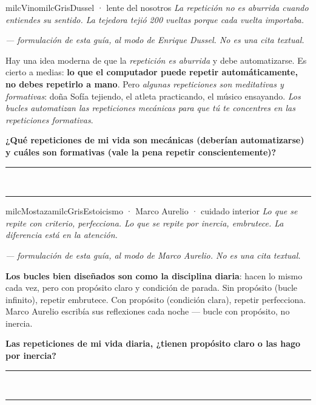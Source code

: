 \documentclass[11pt,letterpaper]{article}
\newcommand{\linead}[1]{\noindent\color{milcLinea}\rule{#1}{0.5pt}\color{milcNegro}}
\begin{document}
\begin{softbox}{milcVino}{milcGris}{Dussel · lente del nosotros}
\textit{La repetición no es aburrida cuando entiendes su sentido. La tejedora tejió 200 vueltas porque cada vuelta importaba.}

{\footnotesize\itshape\color{milcNegro!70}--- formulación de esta guía, al modo de Enrique Dussel. No es una cita textual.}

Hay una idea moderna de que la \emph{repetición es aburrida} y debe automatizarse. Es cierto a medias: \textbf{lo que el computador puede repetir automáticamente, no debes repetirlo a mano}. Pero \emph{algunas repeticiones son meditativas y formativas}: doña Sofía tejiendo, el atleta practicando, el músico ensayando. \emph{Los bucles automatizan las repeticiones mecánicas para que tú te concentres en las repeticiones formativas}.

\textbf{¿Qué repeticiones de mi vida son mecánicas (deberían automatizarse) y cuáles son formativas (vale la pena repetir conscientemente)?}
\end{softbox}
\linead{\linewidth}\\[1mm]
\linead{\linewidth}

\begin{softbox}{milcMostaza}{milcGris}{Estoicismo · Marco Aurelio · cuidado interior}
\textit{Lo que se repite con criterio, perfecciona. Lo que se repite por inercia, embrutece. La diferencia está en la atención.}

{\footnotesize\itshape\color{milcNegro!70}--- formulación de esta guía, al modo de Marco Aurelio. No es una cita textual.}

\textbf{Los bucles bien diseñados son como la disciplina diaria}: hacen lo mismo cada vez, pero con propósito claro y condición de parada. Sin propósito (bucle infinito), repetir embrutece. Con propósito (condición clara), repetir perfecciona. Marco Aurelio escribía sus reflexiones cada noche --- bucle con propósito, no inercia.

\textbf{Las repeticiones de mi vida diaria, ¿tienen propósito claro o las hago por inercia?}
\end{softbox}
\linead{\linewidth}\\[1mm]
\linead{\linewidth}
\end{document}
